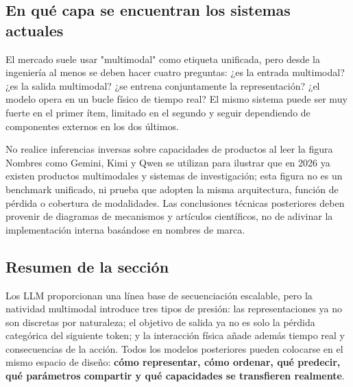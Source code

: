 \subsection{En qué capa se encuentran los sistemas actuales}

El mercado suele usar "multimodal" como etiqueta unificada, pero desde la ingeniería al menos se deben hacer cuatro preguntas: ¿es la entrada multimodal? ¿es la salida multimodal? ¿se entrena conjuntamente la representación? ¿el modelo opera en un bucle físico de tiempo real? El mismo sistema puede ser muy fuerte en el primer ítem, limitado en el segundo y seguir dependiendo de componentes externos en los dos últimos.


\begin{warningbox}{No realice inferencias inversas sobre capacidades de productos al leer la figura}
Nombres como Gemini, Kimi y Qwen se utilizan para ilustrar que en 2026 ya existen productos multimodales y sistemas de investigación; esta figura no es un benchmark unificado, ni prueba que adopten la misma arquitectura, función de pérdida o cobertura de modalidades. Las conclusiones técnicas posteriores deben provenir de diagramas de mecanismos y artículos científicos, no de adivinar la implementación interna basándose en nombres de marca.
\end{warningbox}

\subsection{Resumen de la sección}

Los LLM proporcionan una línea base de secuenciación escalable, pero la natividad multimodal introduce tres tipos de presión: las representaciones ya no son discretas por naturaleza; el objetivo de salida ya no es solo la pérdida categórica del siguiente token; y la interacción física añade además tiempo real y consecuencias de la acción. Todos los modelos posteriores pueden colocarse en el mismo espacio de diseño: \textbf{cómo representar, cómo ordenar, qué predecir, qué parámetros compartir y qué capacidades se transfieren realmente}.


